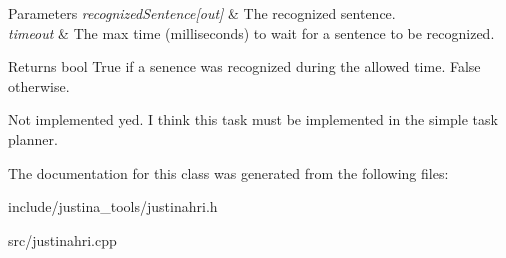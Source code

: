 \begin{DoxyParams}{Parameters}
{\em recognized\+Sentence\mbox{[}out\mbox{]}} & The recognized sentence. \\
\hline
{\em timeout} & The max time (milliseconds) to wait for a sentence to be recognized. \\
\hline
\end{DoxyParams}
\begin{DoxyReturn}{Returns}
bool True if a senence was recognized during the allowed time. False otherwise. 
\end{DoxyReturn}
Not implemented yed. I think this task must be implemented in the simple task planner.

The documentation for this class was generated from the following files\+:\begin{DoxyCompactItemize}
\item 
include/justina\+\_\+tools/justinahri.\+h\item 
src/justinahri.\+cpp\end{DoxyCompactItemize}
